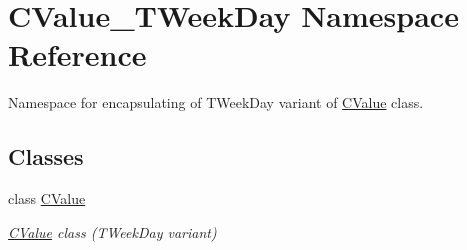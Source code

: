 \hypertarget{namespace_c_value___t_week_day}{}\section{C\+Value\+\_\+\+T\+Week\+Day Namespace Reference}
\label{namespace_c_value___t_week_day}


Namespace for encapsulating of {\ttfamily T\+Week\+Day} variant of \hyperlink{class_c_value___t_week_day_1_1_c_value}{C\+Value} class.  


\subsection*{Classes}
\begin{DoxyCompactItemize}
\item 
class \hyperlink{class_c_value___t_week_day_1_1_c_value}{C\+Value}
\begin{DoxyCompactList}\small\item\em \hyperlink{class_c_value___t_week_day_1_1_c_value}{C\+Value} class ({\ttfamily T\+Week\+Day} variant) \end{DoxyCompactList}\end{DoxyCompactItemize}
